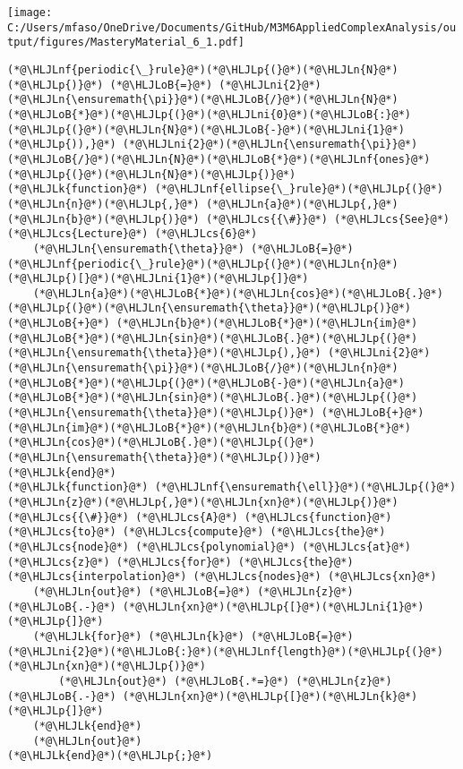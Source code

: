 \documentclass[12pt,a4paper]{article}
\newcommand{\HLJLk}[1]{\textcolor[RGB]{148,91,176}{\textbf{#1}}}
\newcommand{\HLJLn}[1]{#1}
\newcommand{\HLJLnf}[1]{\textcolor[RGB]{66,102,213}{#1}}
\newcommand{\HLJLni}[1]{\textcolor[RGB]{59,151,46}{#1}}
\newcommand{\HLJLoB}[1]{\textcolor[RGB]{102,102,102}{\textbf{#1}}}
\newcommand{\HLJLp}[1]{#1}
\newcommand{\HLJLcs}[1]{\textcolor[RGB]{153,153,119}{\textit{#1}}}
\begin{document}
\texttt{[image: C:/Users/mfaso/OneDrive/Documents/GitHub/M3M6AppliedComplexAnalysis/output/figures/MasteryMaterial\_6\_1.pdf]}

\begin{lstlisting}
(*@\HLJLnf{periodic{\_}rule}@*)(*@\HLJLp{(}@*)(*@\HLJLn{N}@*)(*@\HLJLp{)}@*) (*@\HLJLoB{=}@*) (*@\HLJLni{2}@*)(*@\HLJLn{\ensuremath{\pi}}@*)(*@\HLJLoB{/}@*)(*@\HLJLn{N}@*)(*@\HLJLoB{*}@*)(*@\HLJLp{(}@*)(*@\HLJLni{0}@*)(*@\HLJLoB{:}@*)(*@\HLJLp{(}@*)(*@\HLJLn{N}@*)(*@\HLJLoB{-}@*)(*@\HLJLni{1}@*)(*@\HLJLp{)),}@*) (*@\HLJLni{2}@*)(*@\HLJLn{\ensuremath{\pi}}@*)(*@\HLJLoB{/}@*)(*@\HLJLn{N}@*)(*@\HLJLoB{*}@*)(*@\HLJLnf{ones}@*)(*@\HLJLp{(}@*)(*@\HLJLn{N}@*)(*@\HLJLp{)}@*)
(*@\HLJLk{function}@*) (*@\HLJLnf{ellipse{\_}rule}@*)(*@\HLJLp{(}@*)(*@\HLJLn{n}@*)(*@\HLJLp{,}@*) (*@\HLJLn{a}@*)(*@\HLJLp{,}@*) (*@\HLJLn{b}@*)(*@\HLJLp{)}@*) (*@\HLJLcs{{\#}}@*) (*@\HLJLcs{See}@*) (*@\HLJLcs{Lecture}@*) (*@\HLJLcs{6}@*)
    (*@\HLJLn{\ensuremath{\theta}}@*) (*@\HLJLoB{=}@*) (*@\HLJLnf{periodic{\_}rule}@*)(*@\HLJLp{(}@*)(*@\HLJLn{n}@*)(*@\HLJLp{)[}@*)(*@\HLJLni{1}@*)(*@\HLJLp{]}@*)
    (*@\HLJLn{a}@*)(*@\HLJLoB{*}@*)(*@\HLJLn{cos}@*)(*@\HLJLoB{.}@*)(*@\HLJLp{(}@*)(*@\HLJLn{\ensuremath{\theta}}@*)(*@\HLJLp{)}@*) (*@\HLJLoB{+}@*) (*@\HLJLn{b}@*)(*@\HLJLoB{*}@*)(*@\HLJLn{im}@*)(*@\HLJLoB{*}@*)(*@\HLJLn{sin}@*)(*@\HLJLoB{.}@*)(*@\HLJLp{(}@*)(*@\HLJLn{\ensuremath{\theta}}@*)(*@\HLJLp{),}@*) (*@\HLJLni{2}@*)(*@\HLJLn{\ensuremath{\pi}}@*)(*@\HLJLoB{/}@*)(*@\HLJLn{n}@*)(*@\HLJLoB{*}@*)(*@\HLJLp{(}@*)(*@\HLJLoB{-}@*)(*@\HLJLn{a}@*)(*@\HLJLoB{*}@*)(*@\HLJLn{sin}@*)(*@\HLJLoB{.}@*)(*@\HLJLp{(}@*)(*@\HLJLn{\ensuremath{\theta}}@*)(*@\HLJLp{)}@*) (*@\HLJLoB{+}@*) (*@\HLJLn{im}@*)(*@\HLJLoB{*}@*)(*@\HLJLn{b}@*)(*@\HLJLoB{*}@*)(*@\HLJLn{cos}@*)(*@\HLJLoB{.}@*)(*@\HLJLp{(}@*)(*@\HLJLn{\ensuremath{\theta}}@*)(*@\HLJLp{))}@*)
(*@\HLJLk{end}@*)
(*@\HLJLk{function}@*) (*@\HLJLnf{\ensuremath{\ell}}@*)(*@\HLJLp{(}@*)(*@\HLJLn{z}@*)(*@\HLJLp{,}@*)(*@\HLJLn{xn}@*)(*@\HLJLp{)}@*) (*@\HLJLcs{{\#}}@*) (*@\HLJLcs{A}@*) (*@\HLJLcs{function}@*) (*@\HLJLcs{to}@*) (*@\HLJLcs{compute}@*) (*@\HLJLcs{the}@*) (*@\HLJLcs{node}@*) (*@\HLJLcs{polynomial}@*) (*@\HLJLcs{at}@*) (*@\HLJLcs{z}@*) (*@\HLJLcs{for}@*) (*@\HLJLcs{the}@*) (*@\HLJLcs{interpolation}@*) (*@\HLJLcs{nodes}@*) (*@\HLJLcs{xn}@*)
    (*@\HLJLn{out}@*) (*@\HLJLoB{=}@*) (*@\HLJLn{z}@*) (*@\HLJLoB{.-}@*) (*@\HLJLn{xn}@*)(*@\HLJLp{[}@*)(*@\HLJLni{1}@*)(*@\HLJLp{]}@*)
    (*@\HLJLk{for}@*) (*@\HLJLn{k}@*) (*@\HLJLoB{=}@*) (*@\HLJLni{2}@*)(*@\HLJLoB{:}@*)(*@\HLJLnf{length}@*)(*@\HLJLp{(}@*)(*@\HLJLn{xn}@*)(*@\HLJLp{)}@*)
        (*@\HLJLn{out}@*) (*@\HLJLoB{.*=}@*) (*@\HLJLn{z}@*) (*@\HLJLoB{.-}@*) (*@\HLJLn{xn}@*)(*@\HLJLp{[}@*)(*@\HLJLn{k}@*)(*@\HLJLp{]}@*)
    (*@\HLJLk{end}@*)
    (*@\HLJLn{out}@*)
(*@\HLJLk{end}@*)(*@\HLJLp{;}@*)
\end{lstlisting}
\end{document}
